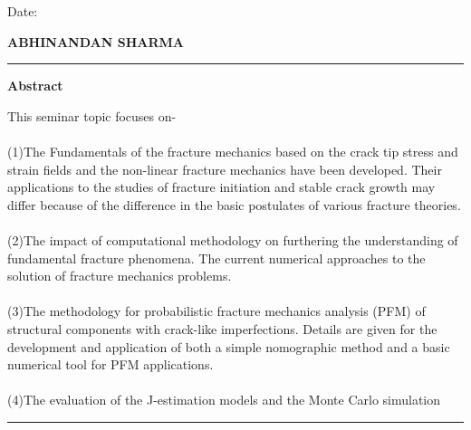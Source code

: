 \documentclass[12pt]{article}
\begin{document}
{    \begin{minipage}[t]{7cm}\bf
        \flushleft

        Date:\\
        \end{minipage}
        \hfill
        \begin{minipage}[t]{7cm}\bf
        \flushright
            ABHINANDAN SHARMA
        \end{minipage}

\pagebreak
}
\tableofcontents
\pagebreak
\listoffigures
\pagebreak
\rule{\textwidth}{.1em}
\begin{center}
\textbf{Abstract}
\end{center}
    This seminar topic focuses on-
    \\\\(1)The Fundamentals of the fracture mechanics based on the crack tip stress and strain fields and the non-linear fracture mechanics have been developed. Their applications to the studies of fracture initiation and stable crack growth may differ because of the difference in the basic postulates of various fracture theories.
    \\\\(2)The impact of computational methodology on furthering the understanding of fundamental fracture phenomena. The current numerical approaches to the solution of fracture mechanics problems.
    \\\\(3)The methodology for probabilistic fracture mechanics analysis (PFM) of structural components with crack-like imperfections. Details are given for the development and application of both a simple nomographic method and a basic numerical tool for PFM applications.
    \\\\(4)The evaluation of the J-estimation models and the Monte Carlo simulation

    

\rule{\textwidth}{.1em}

\end{document}
